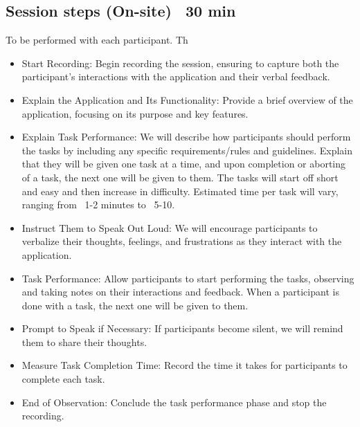 \subsection{Session steps (On-site) ~30 min}
To be performed with each participant. Th
\begin{itemize}
    \item Start Recording: Begin recording the session, ensuring to capture both the participant's interactions with the application and their verbal feedback.
    \item Explain the Application and Its Functionality: Provide a brief overview of the application, focusing on its purpose and key features.
    \item Explain Task Performance: We will describe how participants should perform the tasks by including any specific requirements/rules and guidelines. Explain that they will be given one task at a time, and upon completion or aborting of a task, the next one will be given to them. The tasks will start off short and easy and then increase in difficulty. Estimated time per task will vary, ranging from ~1-2 minutes to ~5-10.
    \item Instruct Them to Speak Out Loud: We will encourage participants to verbalize their thoughts, feelings, and frustrations as they interact with the application.
    \item Task Performance: Allow participants to start performing the tasks, observing and taking notes on their interactions and feedback. When a participant is done with a task, the next one will be given to them.
    \item Prompt to Speak if Necessary: If participants become silent, we will remind them to share their thoughts.
    \item Measure Task Completion Time: Record the time it takes for participants to complete each task.
    \item End of Observation: Conclude the task performance phase and stop the recording.
\end{itemize}

